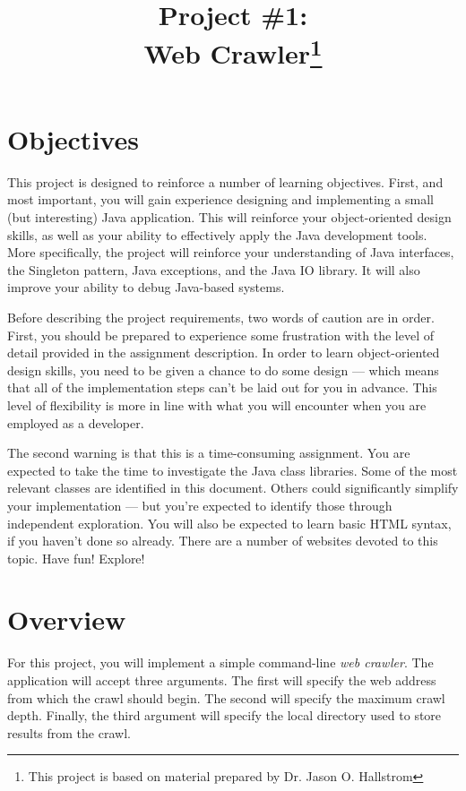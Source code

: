 \documentclass[11pt]{article}
\begin{document}
\title{\vspace{-.35in}Project \#1:\\Web Crawler\footnote{This project 
is based on material prepared by Dr. Jason O. Hallstrom}}
\date{\empty}
\maketitle

\pagestyle{fancy}
\thispagestyle{fancy}

\vspace{-.75in}
\section{Objectives}
This project is designed to reinforce a number of learning objectives. 
First, and most important, you will gain experience designing and 
implementing a small (but interesting) Java application. This will reinforce 
your object-oriented design skills, as well as your ability to effectively
apply the Java development tools. More specifically, the project will reinforce 
your understanding of Java interfaces, the Singleton pattern, Java
exceptions, and the Java IO library. It will also improve your ability to
debug Java-based systems.

Before describing the project requirements, two words of caution are 
in order. First, you should be prepared to experience some frustration
with the level of detail provided in the assignment description. In order
to learn object-oriented design skills, you need to be given a chance 
to do some design --- which means that all of the implementation steps 
can't be laid out for you in advance. This level of flexibility is more in line
with what you will encounter when you are employed as a developer.

The second warning is that this is a time-consuming assignment. You 
are expected to take the time to investigate the Java class libraries. 
Some of the most relevant classes are identified in this document. 
Others could significantly simplify your implementation --- but you're
expected to identify those through independent exploration. You will
also be expected to learn basic HTML syntax, if you haven't done so
already. There are a number of websites devoted to this topic. Have fun!
Explore!

\section{Overview}
For this project, you will implement a simple command-line {\em web crawler}. The
application will accept three arguments. The first will specify the web address from 
which the crawl should begin. The second will specify the maximum crawl depth. Finally, 
the third argument will specify the local directory used to store results from the crawl.
\end{document}
